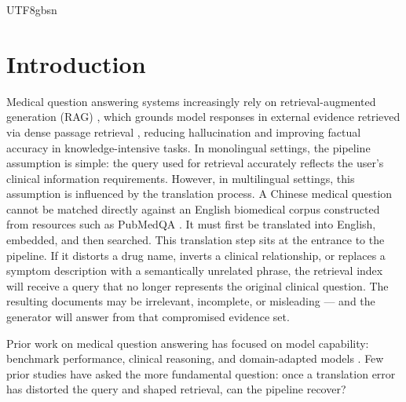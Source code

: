 \documentclass[11pt]{article}
\begin{document}
\begin{CJK}{UTF8}{gbsn}
\section{Introduction}
\label{sec:intro}
Medical question answering systems increasingly rely on retrieval-augmented generation (RAG) \cite{NEURIPS2020_6b493230}, which grounds model responses in external evidence retrieved via dense passage retrieval \cite{karpukhin2020dense}, reducing hallucination and improving factual accuracy in knowledge-intensive tasks. In monolingual settings, the pipeline assumption is simple: the query used for retrieval accurately reflects the user’s clinical information requirements. However, in multilingual settings, this assumption is influenced by the translation process. A Chinese medical question cannot be matched directly against an English biomedical corpus constructed from resources such as PubMedQA \cite{jin-etal-2019-pubmedqa}. It must first be translated into English, embedded, and then searched. This translation step sits at the entrance to the pipeline. If it distorts a drug name, inverts a clinical relationship, or replaces a symptom description with a semantically unrelated phrase, the retrieval index will receive a query that no longer represents the original clinical question. The resulting documents may be irrelevant, incomplete, or misleading --- and the generator will answer from that compromised evidence set.
  
Prior work on medical question answering has focused on model capability: benchmark performance, clinical reasoning, and domain-adapted models \cite{thirunavukarasu2023large, achiam2023gpt, tsatsaronis2012bioasq}. Few prior studies have asked the more fundamental question: once a translation error has distorted the query and shaped retrieval, can the pipeline recover?
  

\end{CJK}
\end{document}
